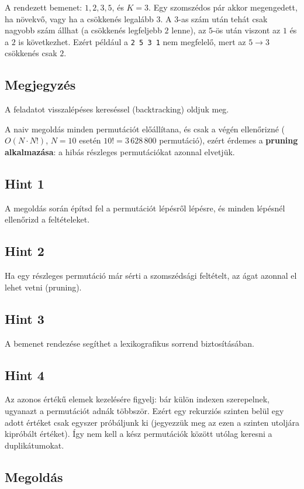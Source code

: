 \documentclass[12pt,a4paper]{article}
\begin{document}
A rendezett bemenet: $1, 2, 3, 5$, és $K = 3$. Egy szomszédos pár akkor megengedett, ha növekvő, vagy ha a csökkenés legalább $3$. A $3$-as szám után tehát csak nagyobb szám állhat (a csökkenés legfeljebb $2$ lenne), az $5$-ös után viszont az $1$ és a $2$ is következhet. Ezért például a \texttt{2 5 3 1} nem megfelelő, mert az $5 \to 3$ csökkenés csak $2$.

\subsection*{Megjegyzés}

A feladatot visszalépéses kereséssel (backtracking) oldjuk meg.

A naiv megoldás minden permutációt előállítana, és csak a végén ellenőrizné ($O(N \cdot N!)$, $N = 10$ esetén $10! = 3\,628\,800$ permutáció), ezért érdemes a \textbf{pruning alkalmazása}: a hibás részleges permutációkat azonnal elvetjük.

\subsection*{Hint 1}
A megoldás során építsd fel a permutációt lépésről lépésre, és minden lépésnél ellenőrizd a feltételeket.

\subsection*{Hint 2}
Ha egy részleges permutáció már sérti a szomszédsági feltételt, az ágat azonnal el lehet vetni (pruning).

\subsection*{Hint 3}
A bemenet rendezése segíthet a lexikografikus sorrend biztosításában.

\subsection*{Hint 4}
Az azonos értékű elemek kezelésére figyelj: bár külön indexen szerepelnek, ugyanazt a permutációt adnák többször. Ezért egy rekurziós szinten belül egy adott értéket csak egyszer próbáljunk ki (jegyezzük meg az ezen a szinten utoljára kipróbált értéket). Így nem kell a kész permutációk között utólag keresni a duplikátumokat.

\subsection*{Megoldás}
\end{document}
